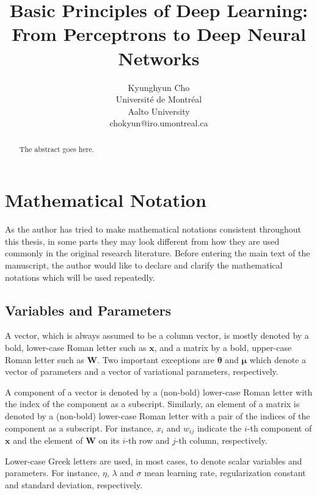 \documentclass{now}
\title{Basic Principles of Deep Learning: From Perceptrons to Deep Neural Networks}
\author{
    Kyunghyun Cho \\
    Universit\'e de Montr\'eal \\
    Aalto University \\
    chokyun@iro.umontreal.ca \\
}
\newcommand{\vect}[1]{\mathbf{#1}}
\newcommand{\vects}[1]{\boldsymbol{#1}}
\newcommand{\matr}[1]{\mathbf{#1}}
\newcommand{\vx}[0]{\vect{x}}
\newcommand{\mW}[0]{\matr{W}}
\newcommand{\vmu}[0]{\vects{\mu}}
\newcommand{\TT}[0]{{\vects{\theta}}}
\begin{document}

\frontmatter

\maketitle

\tableofcontents

\mainmatter

\begin{abstract}
The abstract goes here.
\end{abstract}

\renewcommand{\nomname}{List of Abbreviations}
%
\setlength{\nomitemsep}{-\parsep}
\printnomenclature[5em]


\chapter*{Mathematical Notation}
%

As the author has tried to make mathematical notations consistent throughout
this thesis, in some parts they may look different from how they are used
commonly in the original research literature. Before entering the main text of
the manuscript, the author would like to declare and clarify the mathematical
notations which will be used repeatedly.

\section*{Variables and Parameters}

A vector, which is always assumed to be a column vector, is mostly denoted by a
bold, lower-case Roman letter such as $\vx$, and a matrix by a bold, upper-case
Roman letter such as $\mW$. Two important exceptions are $\TT$ and $\vmu$ which
denote a vector of parameters and a vector of variational parameters,
respectively.

A component of a vector is denoted by a (non-bold) lower-case Roman letter with
the index of the component as a subscript.  Similarly, an element of a matrix
is denoted by a (non-bold) lower-case Roman letter with a pair of the indices
of the component as a subscript. For instance, $x_i$ and $w_{ij}$ indicate the
$i$-th component of $\vx$ and the element of $\mW$ on its $i$-th row and $j$-th
column, respectively.

Lower-case Greek letters are used, in most cases, to denote scalar variables
and parameters. For instance, $\eta$, $\lambda$ and $\sigma$ mean learning
rate, regularization constant and standard deviation, respectively. 
\end{document}
